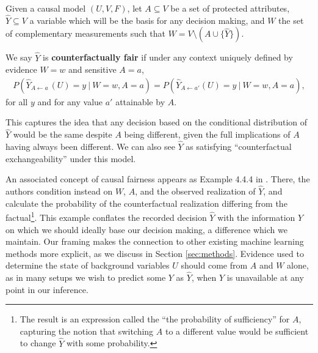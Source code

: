 Given a causal model $(U, V, F)$, let $A\subseteq V$ be a set of protected
attributes, $\hat Y \subseteq V$ a variable which will be the basis for
any decision making, and $W$ the set of complementary measurements such that
$W= V \setminus ( A \cup \{\hat Y\})$.
\begin{define}
We say $\hat Y$ is {\bf counterfactually fair}
if under any context uniquely defined by evidence $W = w$ and sensitive $A = a$,
  \label{eq:cf_definition}
\begin{align}
  P(\hat Y_{A \leftarrow a\ }(U) = y\ |\ W = w, A = a)  =%
  P(\hat Y_{A \leftarrow a'}(U) = y\ |\ W = w, A = a), 
\end{align}
for all $y$ and for any value $a'$ attainable by $A$.
\end{define}
This captures the idea that any decision based on the
conditional distribution of $\hat Y$ would be the same despite  $A$ being
different, given the full implications of $A$ having always been different.
We can also see $\hat Y$ as satisfying ``counterfactual exchangeability''
under this model.

An associated concept of causal fairness appears as Example 4.4.4 in
\citet{pearl:16}. There, the authors condition instead on $W$, $A$,
and the observed realization of $\hat Y$, and calculate the
probability of the counterfactual realization differing from the
factual\footnote{The result is an expression called the ``the
  probability of sufficiency'' for $A$, capturing the notion that
  switching $A$ to a different value would be sufficient to change
  $\hat Y$ with some probability.}. This example conflates the
recorded decision $\hat Y$ with the information $Y$ on which we should
ideally base our decision making, a difference which we maintain.  Our
framing makes the connection to other existing machine learning
methods more explicit, as we discuss in Section \ref{sec:methods}.
Evidence used to determine the state of background variables $U$
should come from $A$ and $W$ alone, as in many setups we wish to
predict some $Y$ as $\hat Y$, when $Y$ is unavailable at any point in
our inference.

